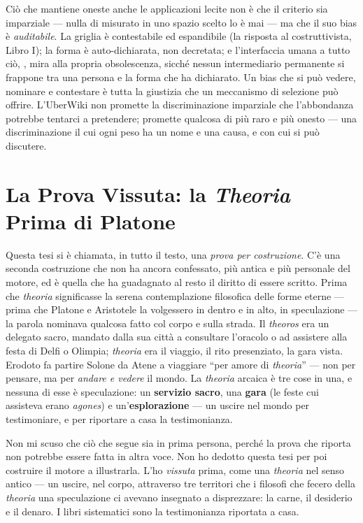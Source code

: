 Ci\`o che mantiene oneste anche le applicazioni lecite non \`e che il criterio sia
imparziale --- nulla di misurato in uno spazio scelto lo \`e mai --- ma che il suo
bias \`e \emph{auditabile}. La griglia \`e contestabile ed espandibile (la risposta
al costruttivista, Libro I); la forma \`e auto-dichiarata, non decretata; e
l'interfaccia umana a tutto ci\`o, , mira alla propria obsolescenza,
sicch\'e nessun intermediario permanente si frappone tra una persona e la forma che
ha dichiarato. Un bias che si pu\`o vedere,
nominare e contestare \`e tutta la giustizia che un meccanismo di selezione pu\`o
offrire. L'UberWiki non promette la discriminazione imparziale che l'abbondanza
potrebbe tentarci a pretendere; promette qualcosa di pi\`u raro e pi\`u onesto ---
una discriminazione il cui ogni peso ha un nome e una causa, e con cui si pu\`o
discutere.

\section*{La Prova Vissuta: la \emph{Theoria} Prima di Platone}

Questa tesi si \`e chiamata, in tutto il testo, una \emph{prova per costruzione}. C'\`e
una seconda costruzione che non ha ancora confessato, pi\`u antica e pi\`u personale
del motore, ed \`e quella che ha guadagnato al resto il diritto di essere scritto.
Prima che \emph{theoria} significasse la serena contemplazione filosofica delle forme
eterne --- prima che Platone e Aristotele la volgessero in dentro e in alto, in
speculazione --- la parola nominava qualcosa fatto col corpo e sulla strada. Il
\emph{theoros} era un delegato sacro, mandato dalla sua citt\`a a consultare l'oracolo
o ad assistere alla festa di Delfi o Olimpia; \emph{theoria} era il viaggio, il rito
presenziato, la gara vista. Erodoto fa partire Solone da Atene a viaggiare ``per amore
di \emph{theoria}'' --- non per pensare, ma per \emph{andare e vedere} il mondo. La
\emph{theoria} arcaica \`e tre cose in una, e nessuna di esse \`e speculazione: un
\textbf{servizio sacro}, una \textbf{gara} (le feste cui assisteva erano \emph{agones})
e un'\textbf{esplorazione} --- un uscire nel mondo per testimoniare, e per riportare a
casa la testimonianza.

Non mi scuso che ci\`o che segue sia in prima persona, perch\'e la prova che riporta
non potrebbe essere fatta in altra voce. Non ho dedotto questa tesi per poi costruire
il motore a illustrarla. L'ho \emph{vissuta} prima, come una \emph{theoria} nel senso
antico --- un uscire, nel corpo, attraverso tre territori che i filosofi che fecero
della \emph{theoria} una speculazione ci avevano insegnato a disprezzare: la carne, il
desiderio e il denaro. I libri sistematici sono la testimonianza riportata a casa.

